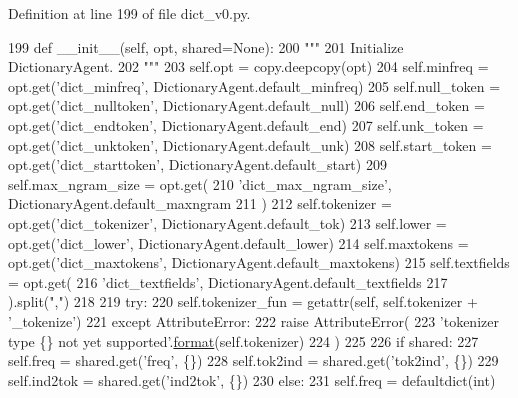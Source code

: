 Definition at line 199 of file dict\+\_\+v0.\+py.


\begin{DoxyCode}
199     \textcolor{keyword}{def }\_\_init\_\_(self, opt, shared=None):
200         \textcolor{stringliteral}{"""}
201 \textcolor{stringliteral}{        Initialize DictionaryAgent.}
202 \textcolor{stringliteral}{        """}
203         self.opt = copy.deepcopy(opt)
204         self.minfreq = opt.get(\textcolor{stringliteral}{'dict\_minfreq'}, DictionaryAgent.default\_minfreq)
205         self.null\_token = opt.get(\textcolor{stringliteral}{'dict\_nulltoken'}, DictionaryAgent.default\_null)
206         self.end\_token = opt.get(\textcolor{stringliteral}{'dict\_endtoken'}, DictionaryAgent.default\_end)
207         self.unk\_token = opt.get(\textcolor{stringliteral}{'dict\_unktoken'}, DictionaryAgent.default\_unk)
208         self.start\_token = opt.get(\textcolor{stringliteral}{'dict\_starttoken'}, DictionaryAgent.default\_start)
209         self.max\_ngram\_size = opt.get(
210             \textcolor{stringliteral}{'dict\_max\_ngram\_size'}, DictionaryAgent.default\_maxngram
211         )
212         self.tokenizer = opt.get(\textcolor{stringliteral}{'dict\_tokenizer'}, DictionaryAgent.default\_tok)
213         self.lower = opt.get(\textcolor{stringliteral}{'dict\_lower'}, DictionaryAgent.default\_lower)
214         self.maxtokens = opt.get(\textcolor{stringliteral}{'dict\_maxtokens'}, DictionaryAgent.default\_maxtokens)
215         self.textfields = opt.get(
216             \textcolor{stringliteral}{'dict\_textfields'}, DictionaryAgent.default\_textfields
217         ).split(\textcolor{stringliteral}{","})
218 
219         \textcolor{keywordflow}{try}:
220             self.tokenizer\_fun = getattr(self, self.tokenizer + \textcolor{stringliteral}{'\_tokenize'})
221         \textcolor{keywordflow}{except} AttributeError:
222             \textcolor{keywordflow}{raise} AttributeError(
223                 \textcolor{stringliteral}{'tokenizer type \{\} not yet supported'}.\hyperlink{namespaceparlai_1_1chat__service_1_1services_1_1messenger_1_1shared__utils_a32e2e2022b824fbaf80c747160b52a76}{format}(self.tokenizer)
224             )
225 
226         \textcolor{keywordflow}{if} shared:
227             self.freq = shared.get(\textcolor{stringliteral}{'freq'}, \{\})
228             self.tok2ind = shared.get(\textcolor{stringliteral}{'tok2ind'}, \{\})
229             self.ind2tok = shared.get(\textcolor{stringliteral}{'ind2tok'}, \{\})
230         \textcolor{keywordflow}{else}:
231             self.freq = defaultdict(int)

\end{DoxyCode}
